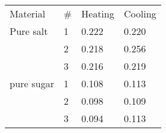 \begin{tabular}{l l | l l}
Material & # & Heating & Cooling\\
Pure salt & 1 & 0.222 & 0.220\\
& 2 & 0.218 & 0.256\\
& 3 & 0.216 & 0.219\\
pure sugar & 1 & 0.108 & 0.113\\
& 2 & 0.098 & 0.109\\
& 3 & 0.094 & 0.113\\
\end{tabular}
